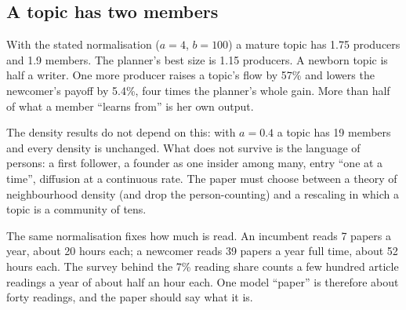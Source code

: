 \subsection{A topic has two members}\label{sec:crit-size}

With the stated normalisation ($a=4$, $b=100$) a mature topic has 1.75 producers and 1.9 members. The planner's best size is 1.15 producers. A newborn topic is half a writer. One more producer raises a topic's flow by 57\% and lowers the newcomer's payoff by 5.4\%, four times the planner's whole gain. More than half of what a member ``learns from'' is her own output.

The density results do not depend on this: with $a=0.4$ a topic has 19 members and every density is unchanged. What does not survive is the language of persons: a first follower, a founder as one insider among many, entry ``one at a time'', diffusion at a continuous rate. The paper must choose between a theory of neighbourhood density (and drop the person-counting) and a rescaling in which a topic is a community of tens.

The same normalisation fixes how much is read. An incumbent reads 7 papers a year, about 20 hours each; a newcomer reads 39 papers a year full time, about 52 hours each. The survey behind the 7\% reading share counts a few hundred article readings a year of about half an hour each. One model ``paper'' is therefore about forty readings, and the paper should say what it is.
